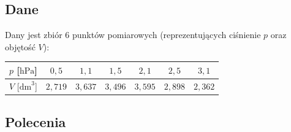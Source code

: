 \documentclass[a4paper,11pt]{article}
\begin{document}
\subsection*{Dane}

Dany jest zbiór 6 punktów pomiarowych (reprezentujących ciśnienie $p$ oraz objętość $V$):

\begin{center}
\begin{tabular}{c|cccccc}
  \toprule
  $p$ [$\text{hPa}$] & $0{,}5$ & $1{,}1$ & $1{,}5$ & $2{,}1$ & $2{,}5$ & $3{,}1$ \\
  \midrule
  $V$ [$\text{dm}^3$] & $2{,}719$ & $3{,}637$ & $3{,}496$ & $3{,}595$ & $2{,}898$ & $2{,}362$ \\
  \bottomrule
\end{tabular}
\end{center}

\subsection*{Polecenia}
\end{document}
